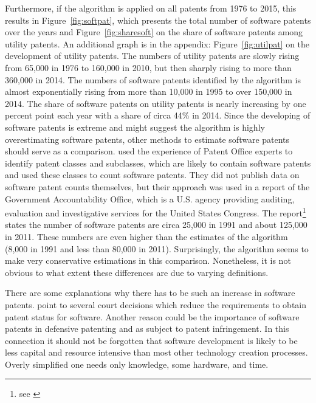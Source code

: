 \documentclass[12pt, a4paper, abstract, parskip]{scrartcl}
\theoremstyle{definition}
\begin{document}
Furthermore, if the algorithm is applied on all patents from 1976 to 2015, this
results in Figure~\ref{fig:softpat}, which presents the total number of
software patents over the years and Figure~\ref{fig:sharesoft} on the share of
software patents among utility patents. An additional graph is in the appendix:
Figure~\ref{fig:utilpat} on the development of utility patents. The numbers of
utility patents are slowly rising from 65,000 in 1976 to 160,000 in 2010, but
then sharply rising to more than 360,000 in 2014. The numbers of software
patents identified by the algorithm is almost exponentially rising from more
than 10,000 in 1995 to over 150,000 in 2014. The share of software patents on
utility patents is nearly increasing by one percent point each year with a
share of circa 44\% in 2014. Since the developing of software patents is
extreme and might suggest the algorithm is highly overestimating software
patents, other methods to estimate software patents should serve as a
comparison. \citet{graham2013smart} used the experience of Patent Office
experts to identify patent classes and subclasses, which are likely to contain
software patents and used these classes to count software patents. They did not
publish data on software patent counts themselves, but their approach was used
in a report of the Government Accountability Office, which is a U.S. agency
providing auditing, evaluation and investigative services for the United States
Congress. The report\footnote{see \citet{usgao2013}} states the number of
software patents are circa 25,000 in 1991 and about 125,000 in 2011. These
numbers are even higher than the estimates of the algorithm (8,000 in 1991 and
less than 80,000 in 2011). Surprisingly, the algorithm seems to make very
conservative estimations in this comparison. Nonetheless, it is not obvious to
what extent these differences are due to varying definitions.

There are some explanations why there has to be such an increase in software
patents. \citet{bessen2007empirical} point to several court decisions which
reduce the requirements to obtain patent status for software. Another reason
could be the importance of software patents in defensive patenting and as
subject to patent infringement. In this connection it should not be forgotten
that software development is likely to be less capital and resource intensive
than most other technology creation processes. Overly simplified one needs only
knowledge, some hardware, and time.

\end{document}
